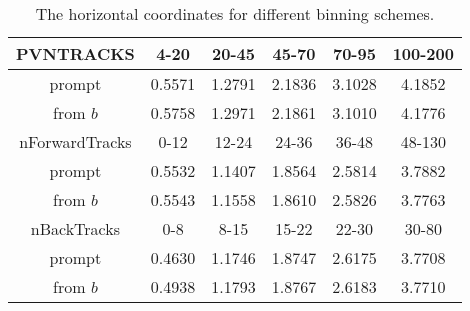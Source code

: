 \begin{table}[H]
\begin{center}
\caption{The horizontal coordinates for different binning schemes.}
\begin{tabular}{|c|ccccc|}
\hline
PVNTRACKS &  4-20 & 20-45  & 45-70   & 70-95   & 100-200   \\ \hline
prompt & 0.5571 & 1.2791 & 2.1836 & 3.1028 & 4.1852 \\
\hline
from $b$ & 0.5758 & 1.2971 & 2.1861 & 3.1010 & 4.1776 \\
\hline
 nForwardTracks &  0-12 & 12-24  & 24-36   & 36-48   & 48-130  \\ \hline
prompt & 0.5532 & 1.1407 & 1.8564 & 2.5814 & 3.7882 \\
\hline
from $b$ & 0.5543 & 1.1558 & 1.8610 & 2.5826 & 3.7763 \\
\hline
nBackTracks &  0-8 & 8-15  & 15-22   & 22-30   & 30-80  \\ \hline
prompt & 0.4630 & 1.1746 & 1.8747 & 2.6175 & 3.7708 \\
\hline
from $b$ & 0.4938 & 1.1793 & 1.8767 & 2.6183 & 3.7710 \\
\hline
\end{tabular}
\end{center}
\label{XCoordinates}
\end{table}

